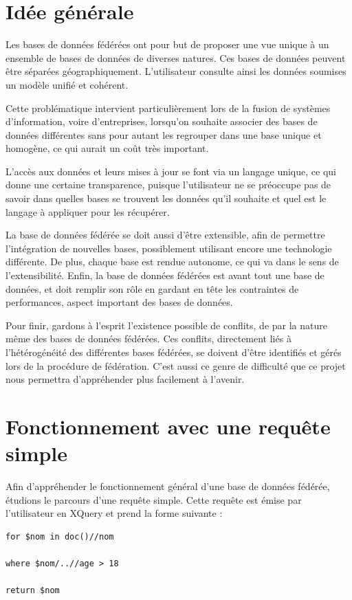 \section{Idée générale}

Les bases de données fédérées ont pour but de proposer une vue unique à un ensemble de bases de données de diverses natures. Ces bases de données peuvent être séparées géographiquement. L’utilisateur consulte ainsi les données soumises un modèle unifié et cohérent.

Cette problématique intervient particulièrement lors de la fusion de systèmes d’information, voire d’entreprises, lorsqu’on souhaite associer des bases de données différentes sans pour autant les regrouper dans une base unique et homogène, ce qui aurait un coût très important.

L’accès aux données et leurs mises à jour se font via un langage unique, ce qui donne une certaine transparence, puisque l’utilisateur ne se préoccupe pas de savoir dans quelles bases se trouvent les données qu’il souhaite et quel est le langage à appliquer pour les récupérer.

La base de données fédérée se doit aussi d’être extensible, afin de permettre l’intégration de nouvelles bases, possiblement utilisant encore une technologie différente. De plus, chaque base est rendue autonome, ce qui va dans le sens de l’extensibilité. Enfin, la base de données fédérées est avant tout une base de données, et doit remplir son rôle en gardant en tête les contraintes de performances, aspect important des bases de données.

Pour finir, gardons à l’esprit l’existence possible de conflits, de par la nature même des bases de données fédérées. Ces conflits, directement liés à l’hétérogénéité des différentes bases fédérées, se doivent d’être identifiés et gérés lors de la procédure de fédération. C’est aussi ce genre de difficulté que ce projet nous permettra d’appréhender plus facilement à l’avenir.


\section{Fonctionnement avec une requête simple}

Afin d’appréhender le fonctionnement général d’une base de données fédérée, étudions le parcours d’une requête simple. Cette requête est émise par l’utilisateur en XQuery et prend la forme suivante :

\begin{verbatim}
for $nom in doc()//nom

where $nom/..//age > 18

return $nom
\end{verbatim}

